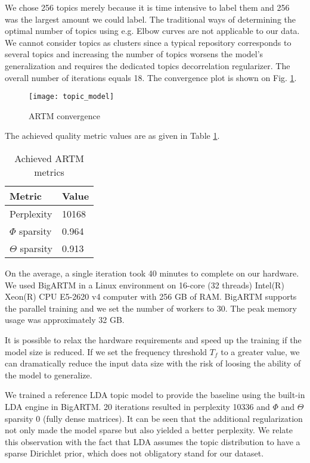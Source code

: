 \documentclass[conference,10pt]{IEEEtran}
\begin{document}
We chose 256 topics merely because it is time intensive to label them and 256 was the largest amount we could label. The traditional ways of determining the optimal number of topics using e.g. Elbow curves are not applicable to our data. We cannot consider topics as clusters since a typical repository corresponds to several topics and increasing the number of topics worsens the model's generalization and requires the dedicated topics decorrelation regularizer.
The overall number of iterations equals 18. The convergence plot is shown on Fig. \ref{topic_model}.
\begin{figure}
\caption{ARTM convergence}
\label{topic_model}
\begin{center}
\texttt{[image: topic\_model]}
\end{center}
\end{figure}

The achieved quality metric values are as given in Table \ref{artm_metrics}.

\begin{table}
\caption{Achieved ARTM metrics}
\label{artm_metrics}
\centering
\begin{tabular}{| l | l |}
\hline
\textbf{Metric} & \textbf{Value} \\
\hline
Perplexity & 10168 \\
$\Phi$ sparsity & 0.964 \\
$\Theta$ sparsity & 0.913 \\
\hline
\end{tabular}
\end{table}

On the average, a single iteration took 40 minutes to complete on our hardware. We used BigARTM in a Linux environment on 16-core (32 threads) Intel(R) Xeon(R) CPU E5-2620 v4 computer with 256 GB of RAM. BigARTM supports the parallel training and we set the number of workers to 30. The peak memory usage was approximately 32 GB.

It is possible to relax the hardware requirements and speed up the training if the model size is reduced. If we set the frequency threshold $T_f$ to a greater value, we can dramatically reduce the input data size with the risk of loosing the ability of the model to generalize.

We trained a reference LDA topic model to provide the baseline using the built-in LDA engine in BigARTM. 20 iterations resulted in perplexity 10336 and $\Phi$ and $\Theta$ sparsity 0 (fully dense matrices). It can be seen that the additional regularization not only made the model sparse but also yielded a better perplexity. We relate this observation with the fact that LDA assumes the topic distribution to have a sparse Dirichlet prior, which does not obligatory stand for our dataset.
\end{document}

